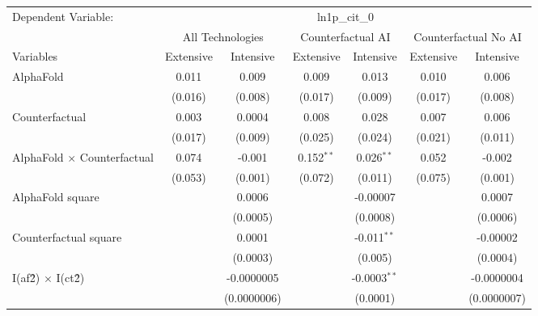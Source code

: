 \begingroup
\centering
\begin{tabular}{lcccccc}
   \tabularnewline \midrule \midrule
   Dependent Variable: & \multicolumn{6}{c}{ln1p\_cit\_0}\\
 & \multicolumn{2}{c}{All Technologies} & \multicolumn{2}{c}{Counterfactual AI} & \multicolumn{2}{c}{Counterfactual No AI} \\
\cmidrule(lr){1-1}\cmidrule(lr){2-3} \cmidrule(lr){4-5} \cmidrule(lr){6-7}
Variables & \multicolumn{1}{c}{Extensive} & \multicolumn{1}{c}{Intensive} & \multicolumn{1}{c}{Extensive} & \multicolumn{1}{c}{Intensive} & \multicolumn{1}{c}{Extensive} & \multicolumn{1}{c}{Intensive} \\
\cmidrule(lr){1-1}\cmidrule(lr){2-2} \cmidrule(lr){3-3} \cmidrule(lr){4-4} \cmidrule(lr){5-5} \cmidrule(lr){6-6} \cmidrule(lr){7-7}
   AlphaFold                          & 0.011   & 0.009       & 0.009        & 0.013          & 0.010   & 0.006\\   
                                      & (0.016) & (0.008)     & (0.017)      & (0.009)        & (0.017) & (0.008)\\   
   Counterfactual                     & 0.003   & 0.0004      & 0.008        & 0.028          & 0.007   & 0.006\\   
                                      & (0.017) & (0.009)     & (0.025)      & (0.024)        & (0.021) & (0.011)\\   
   AlphaFold $\times$ Counterfactual  & 0.074   & -0.001      & 0.152$^{**}$ & 0.026$^{**}$   & 0.052   & -0.002\\   
                                      & (0.053) & (0.001)     & (0.072)      & (0.011)        & (0.075) & (0.001)\\   
   AlphaFold square                   &         & 0.0006      &              & -0.00007       &         & 0.0007\\   
                                      &         & (0.0005)    &              & (0.0008)       &         & (0.0006)\\   
   Counterfactual square              &         & 0.0001      &              & -0.011$^{**}$  &         & -0.00002\\   
                                      &         & (0.0003)    &              & (0.005)        &         & (0.0004)\\   
   I(af\^2) $\times$ I(ct\^2)         &         & -0.0000005  &              & -0.0003$^{**}$ &         & -0.0000004\\   
                                      &         & (0.0000006) &              & (0.0001)       &         & (0.0000007)\\   

\end{tabular}
